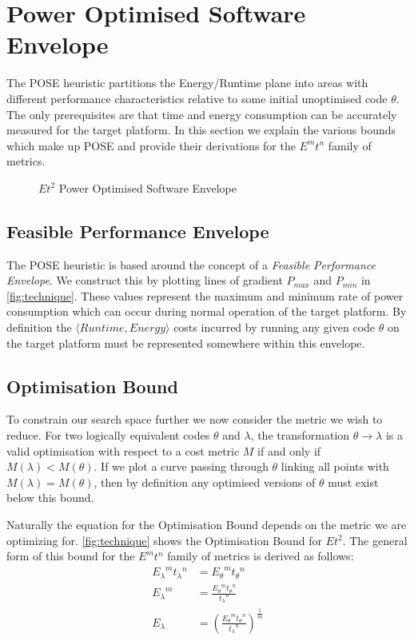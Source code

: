 \section{Power Optimised Software Envelope}
\label{sec:pose}
The POSE heuristic partitions the Energy/Runtime plane into areas with different performance characteristics relative to some initial unoptimised code $\theta$. The only prerequisites are that time and energy consumption can be accurately measured for the target platform.
In this section we explain the various bounds which make up POSE and provide their derivations for the $E^mt^n$ family of metrics.

\begin{figure}
\centering

\caption{$Et^2$ Power Optimised Software Envelope}
\label{fig:technique}
\end{figure}

\subsection{Feasible Performance Envelope}
The POSE heuristic is based around the concept of a \emph{Feasible Performance Envelope}.
We construct this by plotting lines of gradient $P_{max}$ and $P_{min}$ in \autoref{fig:technique}.
These values represent the maximum and minimum rate of power consumption which can occur during normal operation of the target platform.
By definition the $\langle Runtime, Energy\rangle$ costs incurred by running any given code $\theta$ on the target platform must be represented somewhere within this envelope.

\subsection{Optimisation Bound}
To constrain our search space further we now consider the metric we wish to reduce.
For two logically equivalent codes $\theta$ and $\lambda$, the transformation ${\theta \to \lambda}$ is a valid optimisation with respect to a cost metric $M$ if and only if ${M(\lambda) < M(\theta)}$.
If we plot a curve passing through $\theta$ linking all points with ${M(\lambda) = M(\theta)}$, then by definition any optimised versions of $\theta$ must exist below this bound.

Naturally the equation for the Optimisation Bound depends on the metric we are optimizing for.
\autoref{fig:technique} shows the Optimisation Bound for $Et^2$.
The general form of this bound for the $E^mt^n$ family of metrics is derived as follows:
\begin{align}
 {E_\lambda}^m{t_\lambda}^n &= {E_\theta}^m{t_\theta}^n \nonumber \\
 {E_\lambda}^m &= \frac{{E_\theta}^m{t_\theta}^n}{{t_\lambda}^n} \nonumber \\
  E_\lambda &= (\frac{{E_\theta}^m{t_\theta}^n}{{t_\lambda}^n})^\frac{1}{m}
\label{eq:optimisation}
\end{align}

